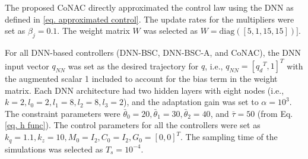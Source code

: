 \documentclass[lettersize,journal]{IEEEtran}
\begin{document}
The proposed CoNAC directly approximated the control law using the DNN as defined in \eqref{eq. approximated control}. The update rates for the multipliers were set as $\beta_{j}=0.1$. The weight matrix $W$ was selected as $W=\text{diag}([5,1,15,15])]$.

For all DNN-based controllers (DNN-BSC, DNN-BSC-A, and CoNAC), the DNN input vector $q_{NN}$ was set as the desired trajectory for ${q}$, i.e., $q_{NN}=[{q_d}^T,1]^T$ with the augmented scalar 1 included to account for the bias term in the weight matrix. 
Each DNN architecture had two hidden layers with eight nodes (i.e., $k=2, l_0=2, l_1=8, l_2=8, l_3=2$), and the adaptation gain was set to $\alpha =10^3$. The constraint parameters were $\bar\theta_0=20, \bar\theta_1=30, \bar\theta_2=40$, and $\bar\tau = 50$ (from Eq. \eqref{eq. h func}). The control parameters for all the controllers were set as ${k_q}=1.1,{k_z}=10,M_0=I_2,C_0=I_2,G_0=[0,0]^T$.
The sampling time of the simulations was selected as $T_s=10^{-4}$.
\end{document}
